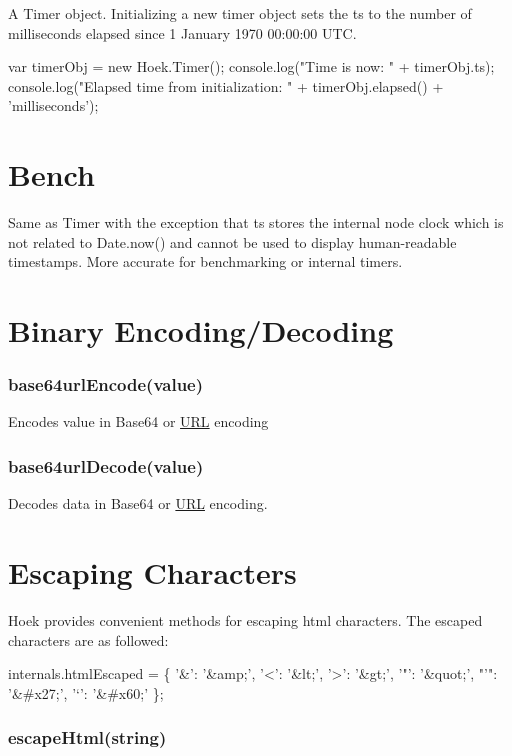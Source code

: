 A Timer object. Initializing a new timer object sets the ts to the number of milliseconds elapsed since 1 January 1970 00\+:00\+:00 U\+TC.


\begin{DoxyCode}
var timerObj = new Hoek.Timer();
console.log("Time is now: " + timerObj.ts);
console.log("Elapsed time from initialization: " + timerObj.elapsed() + 'milliseconds');
\end{DoxyCode}


\section*{Bench}

Same as Timer with the exception that {\ttfamily ts} stores the internal node clock which is not related to {\ttfamily Date.\+now()} and cannot be used to display human-\/readable timestamps. More accurate for benchmarking or internal timers.

\section*{Binary Encoding/\+Decoding}

\subsubsection*{base64url\+Encode(value)}

Encodes value in Base64 or \mbox{\hyperlink{namespace_u_r_l}{U\+RL}} encoding

\subsubsection*{base64url\+Decode(value)}

Decodes data in Base64 or \mbox{\hyperlink{namespace_u_r_l}{U\+RL}} encoding. \section*{Escaping Characters}

Hoek provides convenient methods for escaping html characters. The escaped characters are as followed\+:


\begin{DoxyCode}
internals.htmlEscaped = \{
    '&': '&amp;',
    '<': '&lt;',
    '>': '&gt;',
    '"': '&quot;',
    "'": '&#x27;',
    '`': '&#x60;'
\};
\end{DoxyCode}


\subsubsection*{escape\+Html(string)}


